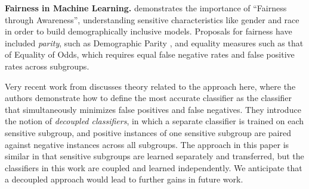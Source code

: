 \documentclass{article}
\begin{document}


{\bf Fairness in Machine Learning.}  \cite{DworkEtAl2012} demonstrates the importance of ``Fairness through Awareness'', understanding sensitive characteristics like gender and race in order to build demographically inclusive models.  Proposals for fairness have included {\it parity}, such as Demographic Parity \cite{DworkEtAl2012,Hardtetal2016equality,beutel2017}, %
and equality measures such as that of \cite{Hardtetal2016equality} Equality of Odds, which requires equal false negative rates and false positive rates across subgroups.

Very recent work from \cite{DworkEtAl18} discusses theory related to the approach here, where the authors demonstrate how to define the most accurate classifier as the classifier that simultaneously minimizes false positives and false negatives. They introduce the notion of {\it decoupled classifiers}, in which a separate classifier is trained on each sensitive subgroup, and positive instances of one sensitive subgroup are paired against negative instances across all subgroups. The approach in this paper is similar in that sensitive subgroups are learned separately and transferred, but the classifiers in this work are coupled and learned independently. We anticipate that a decoupled approach would lead to further gains in future work. \vspace{-.5em}

\end{document}
